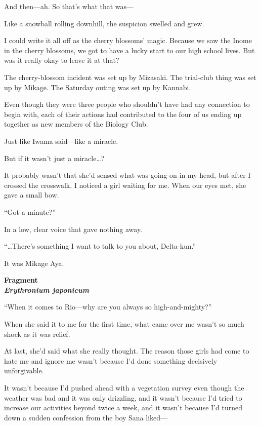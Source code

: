 \documentclass[
    a4paper,
    12pt,
    twoside,
    openany,
    UTF8,
    fontset=windows
]{ctexbook}
\begin{document}
And then---ah. So that's what that was---

Like a snowball rolling downhill, the suspicion swelled and grew.

I could write it all off as the cherry blossoms' magic. Because we saw the Inome in the cherry blossoms, we got to have a lucky start to our high school lives. But was it really okay to leave it at that?

The cherry-blossom incident was set up by Mizasaki. The trial-club thing was set up by Mikage. The Saturday outing was set up by Kannabi.

Even though they were three people who shouldn't have had any connection to begin with, each of their actions had contributed to the four of us ending up together as new members of the Biology Club.

Just like Iwama said---like a miracle.

But if it wasn't just a miracle\dots?

It probably wasn't that she'd sensed what was going on in my head, but after I crossed the crosswalk, I noticed a girl waiting for me. When our eyes met, she gave a small bow.

``Got a minute?''

In a low, clear voice that gave nothing away.

``\dots There's something I want to talk to you about, Delta-kun.''

It was Mikage Aya.

\clearpage
\thispagestyle{plain}
\begin{center}
    \large\bfseries
    Fragment\\
    \textit{Erythronium japonicum}
\end{center}
\label{sec:fragment2}
\vspace{1cm}

``When it comes to Rio---why are you always so high-and-mighty?''

When she said it to me for the first time, what came over me wasn't so much shock as it was relief.

At last, she'd said what she really thought. The reason those girls had come to hate me and ignore me wasn't because I'd done something decisively unforgivable.

It wasn't because I'd pushed ahead with a vegetation survey even though the weather was bad and it was only drizzling, and it wasn't because I'd tried to increase our activities beyond twice a week, and it wasn't because I'd turned down a sudden confession from the boy Sana liked---
\end{document}

